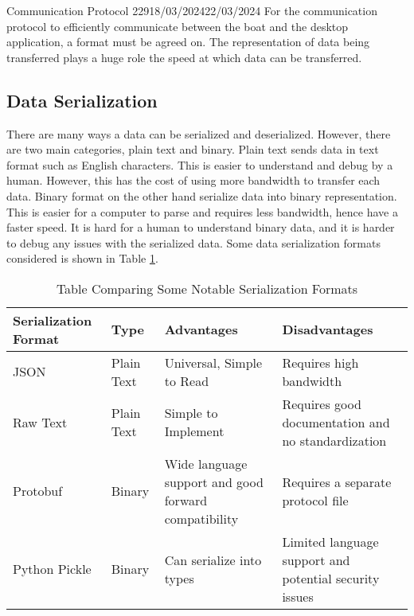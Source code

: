\documentclass[12pt]{article}
\begin{document}
\begin{logbook-entry}{Communication Protocol 2}{29}{18/03/2024}{22/03/2024}
For the communication protocol to efficiently communicate between the boat and the desktop application, a format must be agreed on.
The representation of data being transferred plays a huge role the speed at which data can be transferred.

\subsection*{Data Serialization}

There are many ways a data can be serialized and deserialized.
However, there are two main categories, plain text and binary.
Plain text sends data in text format such as English characters.
This is easier to understand and debug by a human.
However, this has the cost of using more bandwidth to transfer each data.
Binary format on the other hand serialize data into binary representation.
This is easier for a computer to parse and requires less bandwidth, hence have a faster speed.
It is hard for a human to understand binary data, and it is harder to debug any issues with the serialized data.
Some data serialization formats considered is shown in Table \ref{tab:data-serialization}.

\begin{table}[ht]
    \centering
    \caption{Table Comparing Some Notable Serialization Formats}
    \label{tab:data-serialization}
    \vspace{1em}
    \begin{tabular}{ p{7em} p{3em} p{10em} p{10em} }
        Serialization Format & Type       & Advantages                                           & Disadvantages                                          \\
        \hline
        JSON                 & Plain Text & Universal, Simple to Read                            & Requires high bandwidth                                \\
        \hline
        Raw Text             & Plain Text & Simple to Implement                                  & Requires good documentation and no standardization     \\
        \hline
        Protobuf             & Binary     & Wide language support and good forward compatibility & Requires a separate protocol file                      \\
        \hline
        Python Pickle        & Binary     & Can serialize into types                             & Limited language support and potential security issues \\
        \hline
    \end{tabular}
\end{table}


\end{logbook-entry}
\end{document}
